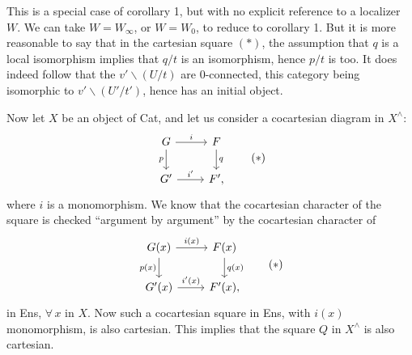 This is a special case of corollary 1, but with no explicit reference to a localizer $W$. We can take $W = W_{\infty}$, or $W = W_0$, to reduce to corollary 1. But it is more reasonable to say that in the cartesian square $(*)$, the assumption that $q$ is a local isomorphism implies that $q/t$ is an isomorphism, hence $p/t$ is too. It does indeed follow that the $v' \backslash (U/t)$ are 0-connected, this category being isomorphic to $v' \backslash (U'/t')$, hence has an initial object. %

Now let $X$ be an object of Cat, and let us consider a cocartesian diagram in $X^{\wedge}$:
\[
\begin{tikzcd}
G \ar[r, "i"] \ar[d, "p"'] & F \ar[d, "q"] \\
G' \ar[r, "i'"] & F',
\end{tikzcd}
\tag*{$(*)$}
\]
where $i$ is a monomorphism. We know that the cocartesian character of the square is checked ``argument by argument'' by the cocartesian character of
\[
\begin{tikzcd}
G(x) \ar[r, "i(x)"] \ar[d, "p(x)"'] & F(x) \ar[d, "q(x)"] \\
G'(x) \ar[r, "i'(x)"] & F'(x),
\end{tikzcd}
\tag*{$(*)$}
\]
in Ens, $\forall\, x$ in $X$. Now such a cocartesian square in Ens, with $i(x)$ monomorphism, is also cartesian. This implies that the square $Q$ in $X^{\wedge}$ is also cartesian.

